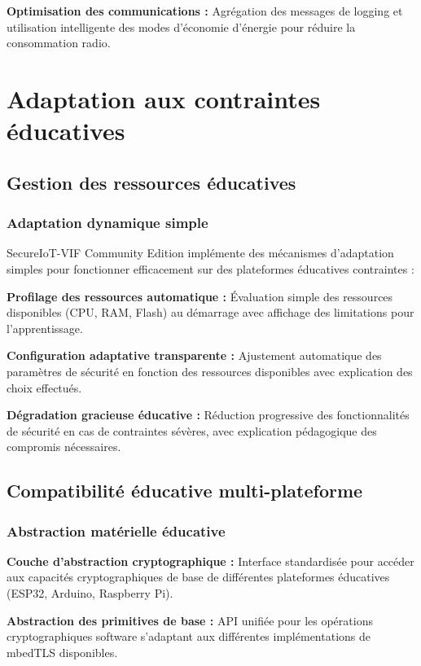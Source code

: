 \textbf{Optimisation des communications :} Agrégation des messages de logging et utilisation intelligente des modes d'économie d'énergie pour réduire la consommation radio.

\section{Adaptation aux contraintes éducatives}

\subsection{Gestion des ressources éducatives}

\subsubsection{Adaptation dynamique simple}

SecureIoT-VIF Community Edition implémente des mécanismes d'adaptation simples pour fonctionner efficacement sur des plateformes éducatives contraintes :

\textbf{Profilage des ressources automatique :} Évaluation simple des ressources disponibles (CPU, RAM, Flash) au démarrage avec affichage des limitations pour l'apprentissage.

\textbf{Configuration adaptative transparente :} Ajustement automatique des paramètres de sécurité en fonction des ressources disponibles avec explication des choix effectués.

\textbf{Dégradation gracieuse éducative :} Réduction progressive des fonctionnalités de sécurité en cas de contraintes sévères, avec explication pédagogique des compromis nécessaires.

\subsection{Compatibilité éducative multi-plateforme}

\subsubsection{Abstraction matérielle éducative}

\textbf{Couche d'abstraction cryptographique :} Interface standardisée pour accéder aux capacités cryptographiques de base de différentes plateformes éducatives (ESP32, Arduino, Raspberry Pi).

\textbf{Abstraction des primitives de base :} API unifiée pour les opérations cryptographiques software s'adaptant aux différentes implémentations de mbedTLS disponibles.

